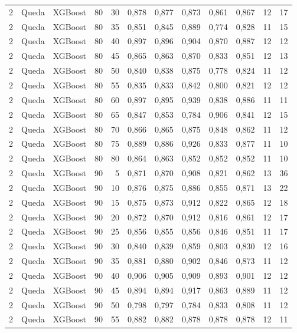\begin{longtable}{ccclrrrrrrrr}
2 & Queda & XGBoost & 80 & 30 & 0,878 & 0,877 & 0,873 & 0,861 & 0,867 & 12 & 17 \\
2 & Queda & XGBoost & 80 & 35 & 0,851 & 0,845 & 0,889 & 0,774 & 0,828 & 11 & 15 \\
2 & Queda & XGBoost & 80 & 40 & 0,897 & 0,896 & 0,904 & 0,870 & 0,887 & 12 & 12 \\
2 & Queda & XGBoost & 80 & 45 & 0,865 & 0,863 & 0,870 & 0,833 & 0,851 & 12 & 13 \\
2 & Queda & XGBoost & 80 & 50 & 0,840 & 0,838 & 0,875 & 0,778 & 0,824 & 11 & 12 \\
2 & Queda & XGBoost & 80 & 55 & 0,835 & 0,833 & 0,842 & 0,800 & 0,821 & 12 & 12 \\
2 & Queda & XGBoost & 80 & 60 & 0,897 & 0,895 & 0,939 & 0,838 & 0,886 & 11 & 11 \\
2 & Queda & XGBoost & 80 & 65 & 0,847 & 0,853 & 0,784 & 0,906 & 0,841 & 12 & 15 \\
2 & Queda & XGBoost & 80 & 70 & 0,866 & 0,865 & 0,875 & 0,848 & 0,862 & 11 & 12 \\
2 & Queda & XGBoost & 80 & 75 & 0,889 & 0,886 & 0,926 & 0,833 & 0,877 & 11 & 10 \\
2 & Queda & XGBoost & 80 & 80 & 0,864 & 0,863 & 0,852 & 0,852 & 0,852 & 11 & 10 \\
2 & Queda & XGBoost & 90 & 5 & 0,871 & 0,870 & 0,908 & 0,821 & 0,862 & 13 & 36 \\
2 & Queda & XGBoost & 90 & 10 & 0,876 & 0,875 & 0,886 & 0,855 & 0,871 & 13 & 22 \\
2 & Queda & XGBoost & 90 & 15 & 0,875 & 0,873 & 0,912 & 0,822 & 0,865 & 12 & 18 \\
2 & Queda & XGBoost & 90 & 20 & 0,872 & 0,870 & 0,912 & 0,816 & 0,861 & 12 & 17 \\
2 & Queda & XGBoost & 90 & 25 & 0,856 & 0,855 & 0,856 & 0,846 & 0,851 & 11 & 17 \\
2 & Queda & XGBoost & 90 & 30 & 0,840 & 0,839 & 0,859 & 0,803 & 0,830 & 12 & 16 \\
2 & Queda & XGBoost & 90 & 35 & 0,881 & 0,880 & 0,902 & 0,846 & 0,873 & 11 & 12 \\
2 & Queda & XGBoost & 90 & 40 & 0,906 & 0,905 & 0,909 & 0,893 & 0,901 & 12 & 12 \\
2 & Queda & XGBoost & 90 & 45 & 0,894 & 0,894 & 0,917 & 0,863 & 0,889 & 11 & 12 \\
2 & Queda & XGBoost & 90 & 50 & 0,798 & 0,797 & 0,784 & 0,833 & 0,808 & 11 & 12 \\
2 & Queda & XGBoost & 90 & 55 & 0,882 & 0,882 & 0,878 & 0,878 & 0,878 & 12 & 11 \\

\end{longtable}
